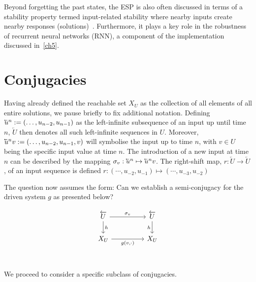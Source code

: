 Beyond forgetting the past states, the ESP is also often discussed in terms of a stability property termed input-related stability where nearby inputs create nearby responses (solutions)~\cite{manjunath2020stability}. 
Furthermore, it plays a key role in the robustness of recurrent neural networks (RNN), a component of the implementation discussed in~\ref{ch5}.

\section{Conjugacies}

Having already defined the reachable set $X_U$ as the collection of all elements of all entire solutions, we pause briefly to fix additional notation.
Defining $\cev{u}^{n}:=(\ldots,u_{n-2} ,u_{n-1})$ as the left-infinite subsequence of an input up until time $n$, $\overleftarrow{U}$ then denotes all such left-infinite sequences in $U$. 
Moreover, $\cev{u}^{n}v:=(\ldots,u_{n-2} ,u_{n-1}, v)$ will symbolise the input up to time $n$, with $v \in U$ being the specific input value at time $n$. 
The introduction of a new input at time $n$ can be described by the mapping $\sigma_v:   \cev{u}^{n} \mapsto \cev{u}^{n}v$. 
The right-shift map, $r:\overleftarrow{U}\to\overleftarrow{U}$, of an input sequence is defined $r: (\cdots, u_{-2},u_{-1}) \mapsto(\cdots, u_{-3},u_{-2})$

The question now assumes the form: Can we establish a semi-conjugacy for the driven system $g$ as presented below?

  \begin{equation}\label{Scomm_h}
    \begin{tikzcd}
	{\overleftarrow{U}} && {\overleftarrow{U}} \\
	{X_U} && {X_U} \\
	\arrow["{\sigma_v}", from=1-1, to=1-3]
	\arrow["h"', from=1-3, to=2-3]
	\arrow["h", from=1-1, to=2-1]
	\arrow["{g(v,\cdot)}"', from=2-1, to=2-3]
\end{tikzcd}
\end{equation}

We proceed to consider a specific subclass of conjugacies.

